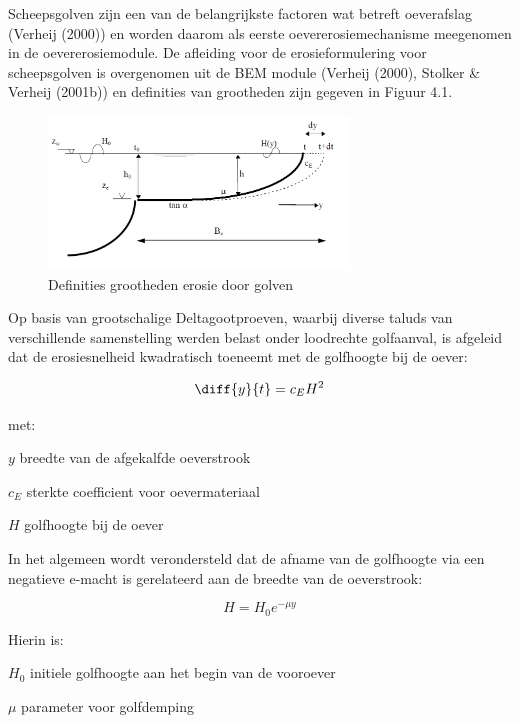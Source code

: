 Scheepsgolven zijn een van de belangrijkste factoren wat betreft oeverafslag (Verheij (2000))  en worden daarom als eerste oevererosiemechanisme meegenomen in de oevererosiemodule.
 De afleiding voor de erosieformulering voor scheepsgolven is overgenomen uit de BEM module (Verheij (2000), Stolker \& Verheij (2001b)) en definities van grootheden zijn gegeven in Figuur 4.1.

\begin{figure}
\includegraphics[width=8cm]{figures/Fig4-1.png}
\caption{Definities grootheden erosie door golven}
\label{Fig4.1}
\end{figure}

Op basis van grootschalige Deltagootproeven, waarbij diverse taluds van verschillende samenstelling werden belast onder loodrechte golfaanval, is afgeleid dat de erosiesnelheid kwadratisch toeneemt met de golfhoogte bij de oever:

\begin{equation}
\diff{y}{t} = c_E H^2
\label{Eq1.1}
\end{equation}

met:

\begin{symbollist}
\item[$y$] breedte van de afgekalfde oeverstrook 
\item[$c_E$] sterkte coefficient voor oevermateriaal 
\item[$H$] golfhoogte bij de oever 
\end{symbollist}

In het algemeen wordt verondersteld dat de afname van de golfhoogte via een negatieve e-macht is gerelateerd aan de breedte van de oeverstrook:

\begin{equation}
H = H_0 e^{-\mu y}
\label{Eq1.2}
\end{equation}

Hierin is:

\begin{symbollist}
\item[$H_0$] initiele golfhoogte aan het begin van de vooroever 
\item[$\mu$] parameter voor golfdemping 
\end{symbollist}

